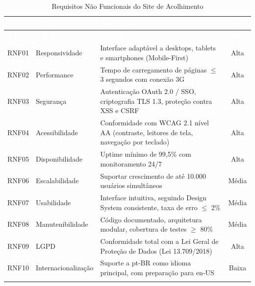 \documentclass[12pt, a4paper]{article}
\begin{document}
\begin{longtable}{|c|p{3.5cm}|p{7.5cm}|c|}
\hline
\rowcolor{faesaLaranja}
\textcolor{white}{\textbf{ID}} & \textcolor{white}{\textbf{Categoria}} & \textcolor{white}{\textbf{Descrição}} & \textcolor{white}{\textbf{Prior.}} \\
\hline
\endfirsthead

\hline
\rowcolor{faesaLaranja}
\textcolor{white}{\textbf{ID}} & \textcolor{white}{\textbf{Categoria}} & \textcolor{white}{\textbf{Descrição}} & \textcolor{white}{\textbf{Prior.}} \\
\hline
\endhead

\rowcolor{reqNFunc}
RNF01 & Responsividade & Interface adaptável a desktops, tablets e smartphones (Mobile-First) & Alta \\
\hline

RNF02 & Performance & Tempo de carregamento de páginas $\leq$ 3 segundos com conexão 3G & Alta \\
\hline

\rowcolor{reqNFunc}
RNF03 & Segurança & Autenticação OAuth 2.0 / SSO, criptografia TLS 1.3, proteção contra XSS e CSRF & Alta \\
\hline

RNF04 & Acessibilidade & Conformidade com WCAG 2.1 nível AA (contraste, leitores de tela, navegação por teclado) & Alta \\
\hline

\rowcolor{reqNFunc}
RNF05 & Disponibilidade & Uptime mínimo de 99,5\% com monitoramento 24/7 & Alta \\
\hline

RNF06 & Escalabilidade & Suportar crescimento de até 10.000 usuários simultâneos & Média \\
\hline

\rowcolor{reqNFunc}
RNF07 & Usabilidade & Interface intuitiva, seguindo Design System consistente, taxa de erro $\leq$ 2\% & Média \\
\hline

RNF08 & Manutenibilidade & Código documentado, arquitetura modular, cobertura de testes $\geq$ 80\% & Média \\
\hline

\rowcolor{reqNFunc}
RNF09 & LGPD & Conformidade total com a Lei Geral de Proteção de Dados (Lei 13.709/2018) & Alta \\
\hline

RNF10 & Internacionalização & Suporte a pt-BR como idioma principal, com preparação para en-US & Baixa \\
\hline

\caption{Requisitos Não Funcionais do Site de Acolhimento}
\label{tab:requisitos-nao-funcionais}
\end{longtable}
\end{document}
